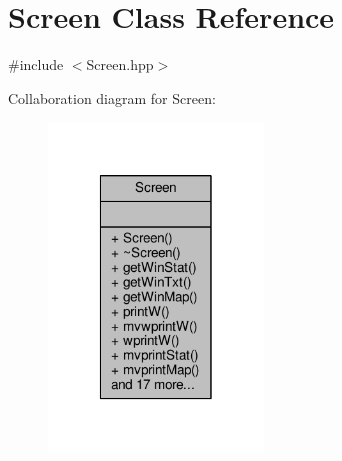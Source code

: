 \hypertarget{class_screen}{\section{Screen Class Reference}
\label{class_screen}
}


{\ttfamily \#include $<$Screen.\-hpp$>$}



Collaboration diagram for Screen\-:
\nopagebreak
\begin{figure}[H]
\begin{center}
\leavevmode
\includegraphics[width=162pt]{class_screen__coll__graph}
\end{center}
\end{figure}
